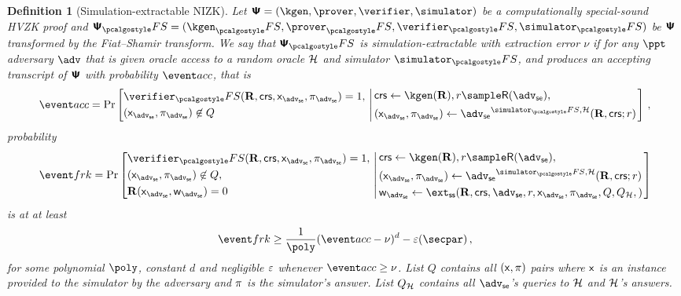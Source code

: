 \let\accentvec\vec \documentclass[runningheads,10pt]{llncs}
\newtheorem{definition}[theorem]{Definition}
\begin{document}
\begin{definition}[Simulation-extractable NIZK]
	\label{def:simext}
	Let $\ps = (\kgen, \prover, \verifier, \simulator)$ be a
	computationally special-sound HVZK proof and $\ps_\fs = (\kgen_\fs,
	\prover_\fs, \verifier_\fs, \simulator_\fs)$ be $\bm{\mathsf{\Psi}}$ transformed by the
	Fiat--Shamir transform.  We say that $\ps_\fs$ is
	\emph{simulation-extractable}
	with \emph{extraction error} $\nu$ if for any $\ppt$ adversary $\adv$ that
	is given oracle access to a random oracle $\mathcal{H}$ and simulator
	$\simulator_\fs$, and produces an accepting transcript of $\bm{\mathsf{\Psi}}$ with
	probability
	$\accProb$, that is
	\[
		\accProb = \Pr \left[
		\begin{aligned}
			& \verifier_\fs(\REL, \crs, \inp_\advse, \zkproof_\advse) = 1,\\
			& (\inp_\advse, \zkproof_\advse) \not\in Q
		\end{aligned}
		\, \left| \,
		\begin{aligned}
			& \crs \gets \kgen(\REL), r \sample \RND{\advse}, \\
			& (\inp_\advse, \zkproof_\advse) \gets \advse^{\simulator_\fs,
			\ro} (\REL, \crs; r) 
		\end{aligned}
		\right.\right]\,,
	\]
	probability
	\[
		\frkProb = \Pr \left[
		\begin{aligned}
			& \verifier_\fs(\REL, \crs, \inp_\advse, \zkproof_\advse) = 1,\\
			& (\inp_\advse, \zkproof_\advse) \not\in Q,\\
			& \REL(\inp_\advse, \wit_\advse) = 0
		\end{aligned}
		\, \left| \,
		\begin{aligned}
			& \crs \gets \kgen(\REL), r \sample \RND{\advse},\\
			& (\inp_\advse, \zkproof_\advse) \gets \advse^{\simulator_\fs,
			\ro} (\REL, \crs; r) \\
			& \wit_\advse \gets \ext_\ss (\REL, \crs, \advse, r, \inp_{\advse}, \zkproof_\advse,
			Q, Q_\ro,) 
		\end{aligned}
		\right.\right]
	\]
	is at at least 
	\[
		\frkProb \geq \frac{1}{\poly} (\accProb - \nu)^d - \eps(\secpar)\,,
	\]
	for some polynomial $\poly$, constant $d$ and negligible $\varepsilon$ whenever
	$\accProb \geq \nu$. List $Q$ contains all $(\mathsf{x}, \pi)$ pairs where
	$\mathsf{x}$ is an instance provided to the simulator by the adversary and
	$\pi$ is the simulator's answer. List $Q_{\mathcal{H}}$ contains all $\advse$'s
	queries to $\mathcal{H}$ and $\mathcal{H}$'s answers. 
\end{definition}
\end{document}
